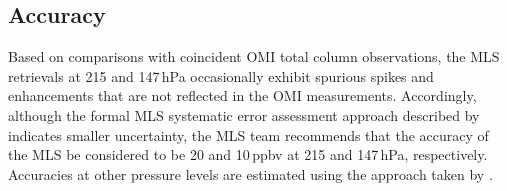

\subsection{Accuracy}

Based on comparisons with coincident OMI total column  observations, the MLS  retrievals at 215 and 147\,hPa occasionally exhibit spurious spikes and enhancements that are not reflected in the OMI measurements.  Accordingly, although the formal MLS systematic error assessment approach described by \citet{ReadEtal:2007} indicates smaller uncertainty, the MLS team recommends that the accuracy of the MLS  be considered to be 20 and 10\,ppbv at 215 and 147\,hPa, respectively.  Accuracies at other pressure levels are estimated using the approach taken by \citet{ReadEtal:2007}.

